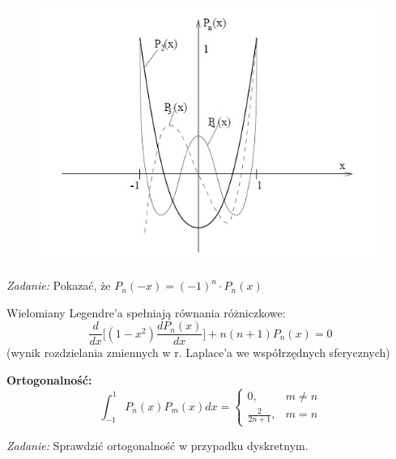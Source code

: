 \begin{frame}
	\begin{figure}
		\includegraphics[height=0.82\textheight]{img/5/img2.jpg}
	\end{figure}
\end{frame}
\begin{frame}
	\begin{flushright}
    	\textit{Zadanie:} \quad Pokazać, że $P_n(-x) = (-1)^n \cdot P_n(x)$ 
    \end{flushright}
	Wielomiany Legendre'a spełniają równania różniczkowe:
        $$\frac{d}{dx}\bigg[(1-x^2)\frac{dP_n(x)}{dx}\bigg]+n(n+1)P_n(x) = 0$$
        (wynik rozdzielania zmiennych w r. Laplace'a we współrzędnych sferycznych) \newline \par
        \textbf{Ortogonalność: }
        $$\int_{-1}^{1}P_n(x)P_m(x)dx = \left\{\begin{array}{cc}
        0, & m \not= n \\
        \frac{2}{2n+1}, & m = n 
        \end{array}\right.$$
        \begin{flushright}
        	\textit{Zadanie: } \quad Sprawdzić ortogonalność w przypadku dyskretnym.
        \end{flushright}
\end{frame}
